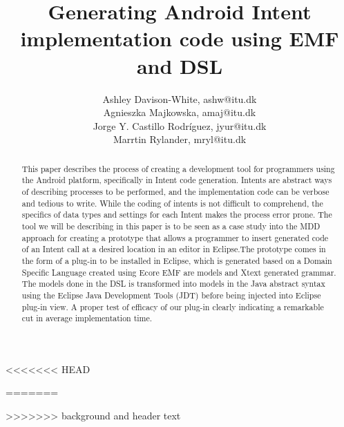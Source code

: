 \documentclass[10pt]{article}
\title{Generating Android Intent implementation code using EMF and DSL}
\author{Ashley Davison-White, ashw@itu.dk 
        \\Agnieszka Majkowska, amaj@itu.dk
        \\Jorge Y. Castillo Rodríguez, jyur@itu.dk
        \\Marrtin Rylander, mryl@itu.dk
}
\begin{document}
\maketitle

 \begin{abstract}
 This paper describes the process of creating a development tool for programmers using the Android platform, specifically in Intent code generation.
Intents are abstract ways of describing processes to be performed, and the implementation code can be verbose and tedious to write. While the coding of intents is not difficult to comprehend,  the specifics of data types and settings for each Intent makes the process error prone. The tool we will be describing in this paper is to be seen as a case study into the MDD approach for creating a prototype that allows a programmer to insert generated code of an Intent call at a desired location in an editor in Eclipse.The prototype comes in the form of a plug-in to be installed in Eclipse, which is generated based on a Domain Specific Language created using Ecore EMF are models and Xtext generated grammar.
 The models done in the DSL is transformed into models in the Java abstract syntax using the Eclipse Java Development Tools (JDT) before being injected into Eclipse plug-in view.
 A proper test of efficacy of our plug-in clearly indicating a remarkable cut in average implementation time.    
 \end{abstract}




















<<<<<<< HEAD

=======

>>>>>>> background and header text

\setlength{\bibsep}{0.0pt}


\end{document}
